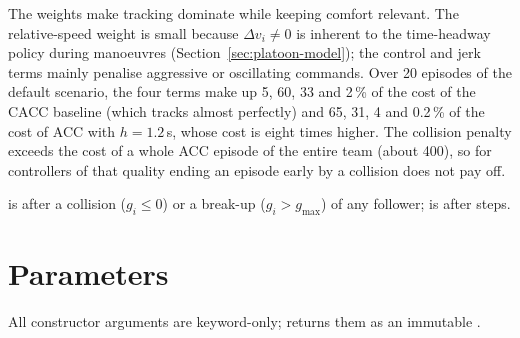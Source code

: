 The weights make tracking dominate while keeping comfort relevant. The
relative-speed weight is small because $\Delta v_i \ne 0$ is inherent to the
time-headway policy during manoeuvres (Section~\ref{sec:platoon-model}); the
control and jerk terms mainly penalise aggressive or oscillating commands. Over
20 episodes of the default scenario, the four terms make up 5, 60, 33 and
2\,\% of the cost of the CACC baseline (which tracks almost perfectly) and 65,
31, 4 and 0.2\,\% of the cost of ACC with $h = 1.2$\,s, whose cost is eight
times higher. The collision penalty exceeds the cost of a whole ACC episode of
the entire team (about 400), so for controllers of that quality ending an
episode early by a collision does not pay off.

 is  after a collision ($g_i \le 0$) or a break-up
($g_i > g_{\max}$) of any follower;  is  after
 steps.

\section{Parameters}\label{sec:platoon-params}

All constructor arguments are keyword-only;  returns them as
an immutable .

